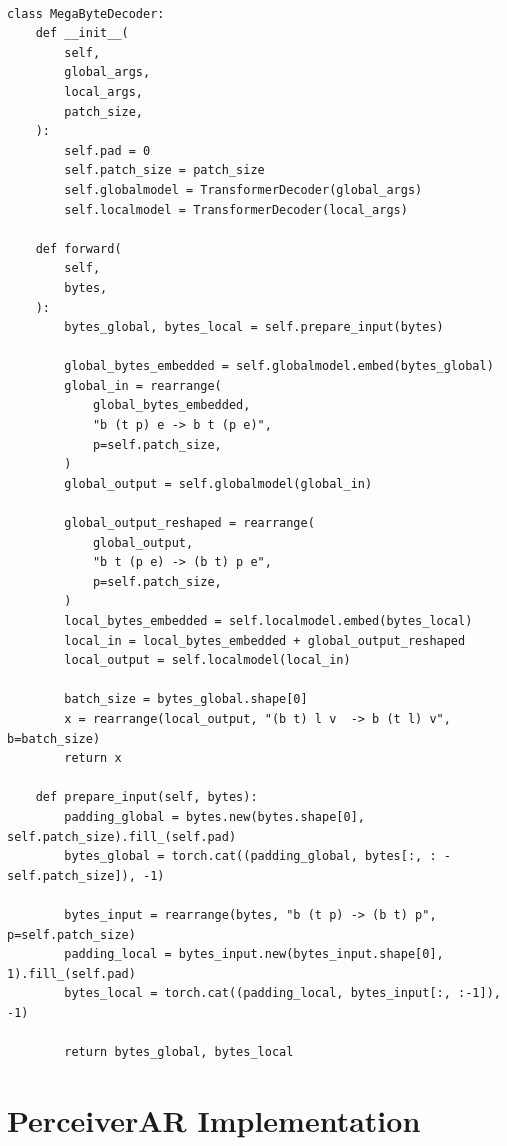 \documentclass{article}
\theoremstyle{plain}
\theoremstyle{definition}
\theoremstyle{remark}
\begin{document}
\begin{lstlisting}[caption={Pseudocode of Megabyte model}, label={lst:code}]

class MegaByteDecoder:
    def __init__(
        self,
        global_args,
        local_args,
        patch_size,
    ):
        self.pad = 0
        self.patch_size = patch_size
        self.globalmodel = TransformerDecoder(global_args)
        self.localmodel = TransformerDecoder(local_args)

    def forward(
        self,
        bytes,
    ):
        bytes_global, bytes_local = self.prepare_input(bytes)

        global_bytes_embedded = self.globalmodel.embed(bytes_global)
        global_in = rearrange(
            global_bytes_embedded,
            "b (t p) e -> b t (p e)",
            p=self.patch_size,
        )
        global_output = self.globalmodel(global_in)

        global_output_reshaped = rearrange(
            global_output,
            "b t (p e) -> (b t) p e",
            p=self.patch_size,
        )
        local_bytes_embedded = self.localmodel.embed(bytes_local)
        local_in = local_bytes_embedded + global_output_reshaped
        local_output = self.localmodel(local_in)

        batch_size = bytes_global.shape[0]
        x = rearrange(local_output, "(b t) l v  -> b (t l) v", b=batch_size)
        return x

    def prepare_input(self, bytes):
        padding_global = bytes.new(bytes.shape[0], self.patch_size).fill_(self.pad)
        bytes_global = torch.cat((padding_global, bytes[:, : -self.patch_size]), -1)

        bytes_input = rearrange(bytes, "b (t p) -> (b t) p", p=self.patch_size)
        padding_local = bytes_input.new(bytes_input.shape[0], 1).fill_(self.pad)
        bytes_local = torch.cat((padding_local, bytes_input[:, :-1]), -1)

        return bytes_global, bytes_local

\end{lstlisting}

\section{PerceiverAR Implementation}
\label{sec:appendix_par}
\end{document}
